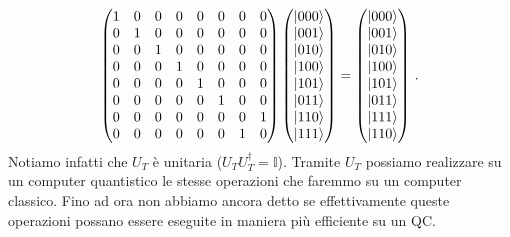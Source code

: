 \begin{equation*}
    \begin{pmatrix}
        1 & 0 & 0 & 0 & 0 & 0 & 0 & 0 \\
        0 & 1 & 0 & 0 & 0 & 0 & 0 & 0 \\
        0 & 0 & 1 & 0 & 0 & 0 & 0 & 0 \\
        0 & 0 & 0 & 1 & 0 & 0 & 0 & 0 \\
        0 & 0 & 0 & 0 & 1 & 0 & 0 & 0 \\
        0 & 0 & 0 & 0 & 0 & 1 & 0 & 0 \\
        0 & 0 & 0 & 0 & 0 & 0 & 0 & 1 \\
        0 & 0 & 0 & 0 & 0 & 0 & 1 & 0
    \end{pmatrix}
    \begin{pmatrix}
        \ket{000} \\ \ket{001} \\ \ket{010} \\ \ket{100} \\ \ket{101} \\ \ket{011} \\ \ket{110} \\ \ket{111}
    \end{pmatrix}
    =
    \begin{pmatrix}
        \ket{000} \\ \ket{001} \\ \ket{010} \\ \ket{100} \\ \ket{101} \\ \ket{011} \\ \ket{111} \\ \ket{110}
    \end{pmatrix} \, .
\end{equation*}
Notiamo infatti che $U_T$ è unitaria ($U_T U_T^\dag = \mathbb{I}$). Tramite $U_T$ possiamo realizzare su un computer quantistico le stesse operazioni che faremmo su un computer classico. Fino ad ora non abbiamo ancora detto se effettivamente queste operazioni possano essere eseguite in maniera più efficiente su un QC. 


